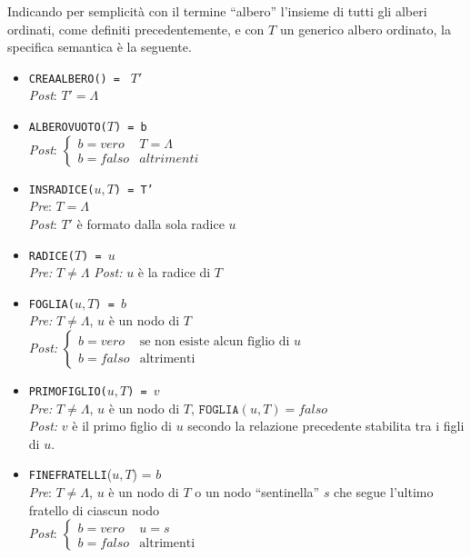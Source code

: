 \documentclass[12pt]{report}
\begin{document}
	Indicando per semplicità con il termine ``albero'' l'insieme di tutti gli alberi ordinati, come definiti precedentemente, e con $T$ un generico albero ordinato, la specifica semantica è la seguente.
	\begin{itemize}
		\item \texttt{CREAALBERO() = } $T'$ \\
		\quad \textit{Post}: $T' = \Lambda$
		\item \texttt{ALBEROVUOTO($T$) = b} \\
		\quad \textit{Post}: $\begin{cases}
			b = vero & T = \Lambda \\
			b = falso & altrimenti
		\end{cases}$
		\item \texttt{INSRADICE($u, T$) = T'} \\
		\quad \textit{Pre}: $T = \Lambda$ \\
		\quad \textit{Post}: $T'$ è formato dalla sola radice $u$
		\item \texttt{RADICE($T$) = $u$} \\
		\quad \textit{Pre:} $T \neq \Lambda$
		\quad \textit{Post:} $u$ è la radice di $T$
		\item \texttt{FOGLIA($u, T$) = $b$} \\
		\quad \textit{Pre:} $T \neq \Lambda$, $u$ è un nodo di $T$ \\
		\quad \textit{Post:} $\begin{cases}
			b = vero & \text{se non esiste alcun figlio di }u \\
			b = falso & \text{altrimenti}
		\end{cases}$
		\item \texttt{PRIMOFIGLIO($u, T$) = $v$} \\
		\quad \textit{Pre:} $T \neq \Lambda$, $u$ è un nodo di $T$, $\texttt{FOGLIA}(u, T) = falso$ \\
		\quad \textit{Post:} $v$ è il primo figlio di $u$ secondo la relazione precedente stabilita tra i figli di $u$.
		\item \texttt{FINEFRATELLI}($u, T$) = $b$ \\
		\quad \textit{Pre}: $T \neq \Lambda$, $u$ è un nodo di $T$ o un nodo ``sentinella'' $s$ che segue l'ultimo fratello di ciascun nodo\\
		\quad \textit{Post}: $\begin{cases}
			b = vero & u = s \\
			b = falso & \text{altrimenti}
		\end{cases}$

\end{itemize}
\end{document}
